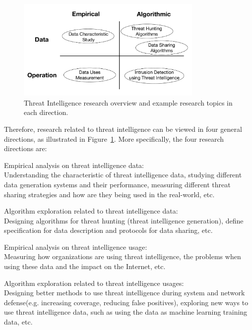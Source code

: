 \begin{figure}
\centering
\includegraphics[width=0.8\textwidth]{threat_intel_research_overview.pdf}
\caption{Threat Intelligence research overview and example research
topics in each direction.}
\label{fig:threat_intel_overview}
\end{figure}

Therefore, research related to threat intelligence can be 
viewed in four general directions, as illustrated in
Figure~\ref{fig:threat_intel_overview}. More specifically, the four 
research directions are: 
\begin{prettylist}
    \item Empirical analysis on threat intelligence data: \\
    Understanding the characteristic of threat intelligence data, studying different
    data generation systems and their performance, measuring different threat 
    sharing strategies and how are they being used in the real-world, etc.
    
    \item Algorithm exploration related to threat intelligence data: \\
    Designing algorithms for threat hunting (threat intelligence generation),
    define specification for data description and protocols for data sharing, etc.
    
    \item Empirical analysis on threat intelligence usage: \\
    Measuring how organizations are using threat intelligence, the problems 
    when using these data and the impact on the Internet, etc.
    
    \item Algorithm exploration related to threat intelligence usages: \\
    Designing better methods to use threat intelligence during system and 
    network defense(e.g. increasing coverage, reducing false positives),
    exploring new ways to use threat intelligence data, such as using the 
    data as machine learning training data, etc.
\end{prettylist}

